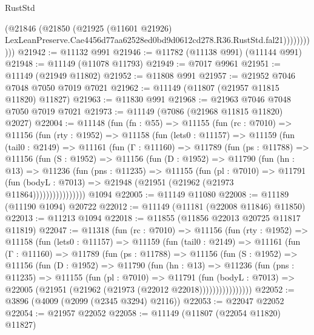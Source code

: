 \begin{lexlean}{RustStd}
\begin{coremodule}
                    (@21846
                      (@21850
                        (@21925
                          (@11601 @21926)
                          LexLeanPreserve.Cae4456d77aa62528ed0bd9d0612cd278.R36.RustStd.fal21)))))))))))
@21942 := @11132 @991
@21946 := @11782 (@11138 @991) (@11144 @991)
@21948 := @11149 (@11078 @11793)
@21949 := @7017 @9961
@21951 := @11149 (@21949 @11802)
@21952 := @11808 @991
@21957 := @21952 @7046 @7048 @7050 @7019 @7021
@21962 := @11149 (@11807 (@21957 @11815 @11820) @11827)
@21963 := @11830 @991
@21968 := @21963 @7046 @7048 @7050 @7019 @7021
@21973 := @11149 (@7086 (@21968 @11815 @11820) @2027)
@22004 := @11148
    (fun (fn : @55) =>
    @11155
      (fun (rc : @7010) =>
      @11156
        (fun (rty : @1952) =>
        @11158
          (fun (lets0 : @11157) =>
          @11159
            (fun (tail0 : @2149) =>
            @11161
              (fun (Γ : @11160) =>
              @11789
                (fun (ps : @11788) =>
                @11156
                  (fun (S : @1952) =>
                  @11156
                    (fun (D : @1952) =>
                    @11790
                      (fun (hn : @13) =>
                      @11236
                        (fun (pns : @11235) =>
                        @11155
                          (fun (pl : @7010) =>
                          @11791
                            (fun (bodyL : @7013) =>
                            @21948 (@21951 (@21962 (@21973 @11864))))))))))))))))
    @1094
@22005 := @11149 @11080
@22008 := @11189 (@11190 @1094) @20722
@22012 := @11149 (@11181 (@22008 @11846) @11850)
@22013 := @11213 @1094
@22018 := @11855 (@11856 @22013 @20725 @11817 @11819)
@22047 := @11318
    (fun (rc : @7010) =>
    @11156
      (fun (rty : @1952) =>
      @11158
        (fun (lets0 : @11157) =>
        @11159
          (fun (tail0 : @2149) =>
          @11161
            (fun (Γ : @11160) =>
            @11789
              (fun (ps : @11788) =>
              @11156
                (fun (S : @1952) =>
                @11156
                  (fun (D : @1952) =>
                  @11790
                    (fun (hn : @13) =>
                    @11236
                      (fun (pns : @11235) =>
                      @11155
                        (fun (pl : @7010) =>
                        @11791
                          (fun (bodyL : @7013) =>
                          @22005 (@21951 (@21962 (@21973 (@22012 @22018))))))))))))))))
@22052 := @3896 (@4009 (@2099 (@2345 @3294) @2116))
@22053 := @22047 @22052
@22054 := @21957 @22052
@22058 := @11149 (@11807 (@22054 @11820) @11827)

\end{coremodule}
\end{lexlean}
